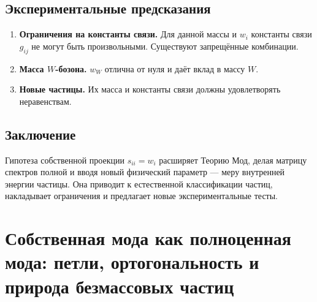 \documentclass[12pt,a4paper]{article}
\begin{document}
\subsection{Экспериментальные предсказания}
\begin{enumerate}[label=(\arabic*)]
    \item \textbf{Ограничения на константы связи.} Для данной массы и $w_i$ константы связи $g_{ij}$ не могут быть произвольными. Существуют запрещённые комбинации.
    \item \textbf{Масса $W$-бозона.} $w_W$ отлична от нуля и даёт вклад в массу $W$.
    \item \textbf{Новые частицы.} Их масса и константы связи должны удовлетворять неравенствам.
\end{enumerate}

\subsection{Заключение}
Гипотеза собственной проекции $s_{ii} = w_i$ расширяет Теорию Мод, делая матрицу спектров полной и вводя новый физический параметр --- меру внутренней энергии частицы. Она приводит к естественной классификации частиц, накладывает ограничения и предлагает новые экспериментальные тесты.

\newpage
\section{Собственная мода как полноценная мода: петли, ортогональность и природа безмассовых частиц}

\begin{abstract}
В Части~IV была предложена гипотеза собственной проекции: $s_{ii} = w_i$. В данной работе эта гипотеза обобщается до логического завершения: собственная проекция рассматривается не как число, а как полноценная мода $M_{i \to i}$, обладающая продольной структурой (дискретным путём --- петлёй) и поперечной структурой (спектральной функцией на этом пути). Вводится понятие ортогональности собственной моды к внешним модам. Показано, что безмассовые частицы естественно определяются как частицы с ортогональной собственной модой и индефинитной метрикой спектрального пространства. Обсуждается иерархия собственных мод и связь с планковской физикой.

\bigskip
\noindent\textbf{Ключевые слова:} Теория Мод, собственная мода, петли, ортогональность, безмассовые частицы, индефинитная метрика.
\end{abstract}
\end{document}
